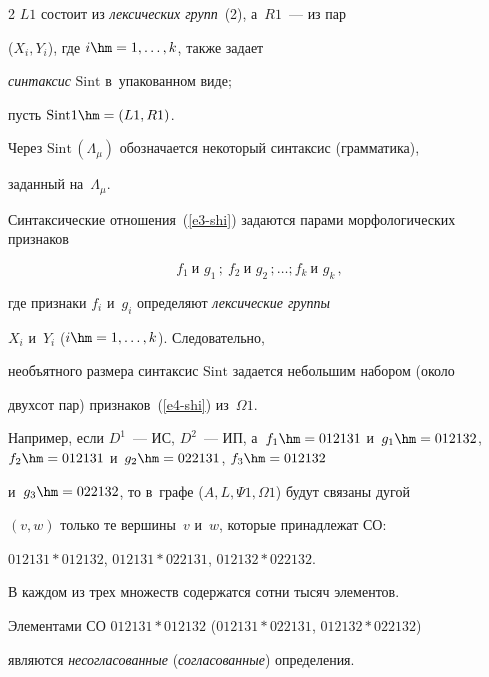 \begin{multicols}{2}
$L1$ состоит из \textit{лексических групп}~(2), а~$R1$~--- из пар 

(${X}_i, {Y}_i$), где $i \hm= 1,\ldots , k$, также задает 

\textit{синтаксис} $\mathrm{Sint}$ в~упакованном виде; 

пусть $\mathrm{Sint}1 \hm= (L1, R1)$. 

Через $\mathrm{Sint}\,(\Lambda_\mu)$ обозначается некоторый синтаксис (грамматика), 

заданный на~$\Lambda_\mu$.

    

    Синтаксические отношения~(\ref{e3-shi}) задаются парами морфологических признаков

    \begin{equation}

    f_1\ \mbox{и } g_1\,;\ 

    f_2\ \mbox{и } g_2\,; \ldots ; 

    f_k\ \mbox{и } g_k\,,

    \label{e4-shi}

    \end{equation}

где признаки $f_i$ и~$g_i$ определяют \textit{лексические группы} 

${X}_i$ и~${Y}_i$ ($i \hm= 1, \ldots , k$). Следовательно, 

необъятного размера синтаксис $\mathrm{Sint}$ задается небольшим набором (около 

двухсот пар) признаков~(\ref{e4-shi}) из~$\Omega1$.

    

    Например, если $D^1$~--- ИС, $D^2$~--- ИП, а~$f_1 \hm= 012131$ и~$g_1 

\hm= 012132$, $f_2 \hm= 012131$ и~$g_2 \hm= 022131$, $f_3 \hm= 012132$ 

и~$g_3 \hm= 022132$, то в~графе ($A, L, \Psi1, \Omega1$) будут связаны дугой 

$(v, w)$ только те вершины~$v$ и~$w$, которые принадлежат СО: 

$012131*012132$, $012131*022131$, $012132*022132$.

    

    В каждом из трех множеств содержатся сотни тысяч элементов. 

Элементами СО $012131*012132$ ($012131*022131$, $012132*022132$) 

являются \textit{несогласованные} (\textit{согласованные}) определения.


\end{multicols}
